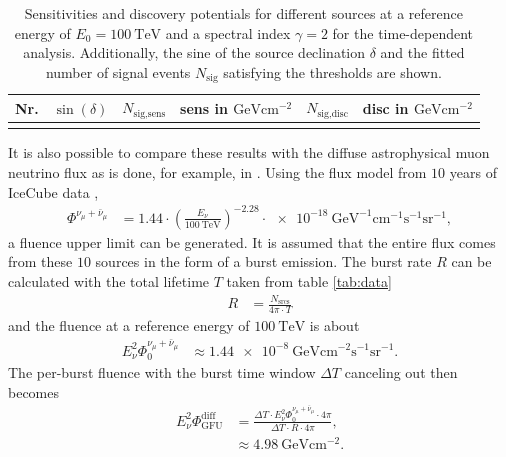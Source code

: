 \begin{table}[H]
  \centering
  \caption{Sensitivities and discovery potentials for different sources at a reference energy of $E_0 = \SI{100}{\tera\electronvolt}$ and a spectral index $\gamma=2$ for the time-dependent analysis. Additionally, the sine of the source declination $\delta$ and the fitted number of signal events $N_\text{sig}$ satisfying the thresholds are shown.}
  \begin{tabular}{ccrcrc}
    \toprule
    Nr. & $\sin{(\delta)}$ & $N_\text{sig,sens}$ &  sens in $\si{\giga\electronvolt\centi\meter\tothe{-2}}$ & $N_\text{sig,disc}$ & disc in $\si{\giga\electronvolt\centi\meter\tothe{-2}}$ \\
    \toprule
      
    \toprule
    \label{tab:sens_disc_time_dep}
  \end{tabular}
\end{table}

It is also possible to compare these results with the diffuse astrophysical muon neutrino flux as is done, for example, in \cite{thorben}.
Using the flux model from $\num{10}$ years of IceCube data \cite{flux_2},
\begin{align}
  \Phi^{\nu_\mu + \bar{\nu}_\mu} &= 1.44\cdot\left(\frac{E_\nu}{\SI{100}{\tera\electronvolt}}\right)^{-2.28}\cdot\SI{e-18}{\giga\electronvolt\tothe{-1}\centi\meter\tothe{-1}\second\tothe{-1}\steradian\tothe{-1}},
\end{align}
a fluence upper limit can be generated.
It is assumed that the entire flux comes from these $\num{10}$ sources in the form of a burst emission.
The burst rate $R$ can be calculated with the total lifetime $T$ taken from table \ref{tab:data}
\begin{align}
  R &= \frac{N_\text{srcs}}{4\pi\cdot T}
\end{align}
and the fluence at a reference energy of $\SI{100}{\tera\electronvolt}$ is about
\begin{align}
  E^2_\nu\Phi_0^{\nu_\mu + \bar{\nu}_\mu} &\approx \SI{1.44e-8}{\giga\electronvolt\centi\meter\tothe{-2}\second\tothe{-1}\steradian\tothe{-1}}.
\end{align}
The per-burst fluence with the burst time window $\Delta T$ canceling out then becomes
\begin{align}
  E^2_\nu\Phi_\text{GFU}^\text{diff} &= \frac{\Delta T \cdot E^2_\nu\Phi_0^{\nu_\mu + \bar{\nu}_\mu} \cdot 4\pi}{\Delta T \cdot R \cdot 4\pi},\\
  &\approx \SI{4.98}{\giga\electronvolt\centi\meter\tothe{-2}}.
\end{align}

